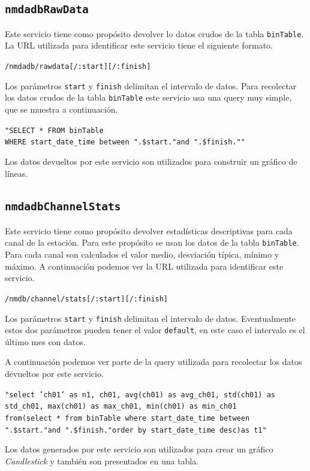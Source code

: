 {	\subsection{\texttt{nmdadbRawData}}
		Este servicio tiene como propósito devolver lo datos crudos de la tabla \texttt{binTable}. La URL utilizada para identificar este
		servicio tiene el siguiente formato. 
	  		\begin{center} \texttt{/nmdadb/rawdata[/:start][/:finish]}  \end{center} 
		Los parámetros \texttt{start} y \texttt{finish} delimitan el intervalo de datos. Para recolectar los datos crudos de la tabla
		\texttt{binTable} este servicio usa una query muy simple, que se muestra a continuación.
	  		\begin{center} \texttt{"SELECT * FROM binTable 
			  		\\	WHERE start\_date\_time between \cc".\$start."\cc and \cc".\$finish."\cc"}
			\end{center} 
		Los datos devueltos por este servicio son utilizados para construir un gráfico de líneas.
	\subsection{\texttt{nmdadbChannelStats}}
		Este servicio tiene como propósito devolver estadísticas descriptivas para cada canal de la estación. Para este propósito se usan los
		datos de la tabla \texttt{binTable}. Para cada canal son calculados el valor medio, desviación típica, mínimo y máximo. A continuación
		podemos ver la URL utilizada para identificar este servicio.
	  		\begin{center} \texttt{/nmdb/channel/stats[/:start][/:finish]}  \end{center} 
		Los parámetros \texttt{start} y \texttt{finish} delimitan el intervalo de datos. Eventualmente estos dos parámetros pueden tener el
		valor \texttt{default}, en este caso el intervalo es el último mes con datos. 
		\par
		A continuación podemos ver parte de la query utilizada para recolectar los datos devueltos por este servicio.
	  		\begin{center} \texttt{"select 'ch01' as n1, ch01, avg(ch01) as avg\_ch01, std(ch01) as std\_ch01, max(ch01) as max\_ch01, min(ch01) as min\_ch01
			  		\\	from(select * from  binTable where start\_date\_time between \cc".\$start."\cc and \cc".\$finish."\cc order by start\_date\_time desc)as t1"}
			\end{center} 
		Los datos generados por este servicio son utilizados para crear un gráfico \emph{Candlestick} y también son presentados en una tabla.
}
